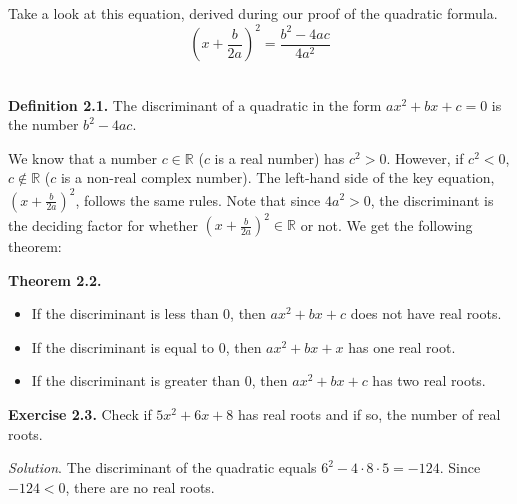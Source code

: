 \documentclass{article}
\begin{document}
Take a look at this equation, derived during our proof of the quadratic formula.
$$(x+\frac{b}{2a})^2=\frac{b^2-4ac}{4a^2}$$\\

\begin{mdframed}
  \textbf{Definition 2.1.} The discriminant of a quadratic in the form $ax^2+bx+c=0$ is the number $b^2-4ac$.
\end{mdframed}

We know that a number $c \in \mathbb{R}$ ($c$ is a real number) has $c^2>0$. However, if $c^2<0$, $c \not\in \mathbb{R}$ ($c$ is a non-real complex number). The left-hand side of the key equation, $(x+\frac{b}{2a})^2$, follows the same rules. Note that since $4a^2 > 0$, the discriminant is the deciding factor for whether $(x+\frac{b}{2a})^2 \in \mathbb{R}$ or not. We get the following theorem:\\

\begin{mdframed}
    \textbf{Theorem 2.2.}
    \begin{itemize}
        \item If the discriminant is less than 0, then $ax^2+bx+c$ does not have real roots.
        \item If the discriminant is equal to 0, then $ax^2+bx+x$ has one real root.
        \item If the discriminant is greater than 0, then $ax^2+bx+c$ has two real roots.
    \end{itemize}
\end{mdframed}

\begin{mdframed}
  \textbf{Exercise 2.3.} Check if $5x^2+6x+8$ has real roots and if so, the number of real roots.
\end{mdframed}
\emph{Solution}. The discriminant of the quadratic equals $6^2-4\cdot8\cdot5 = -124$. Since $-124 < 0$, there are no real roots.
\end{document}
